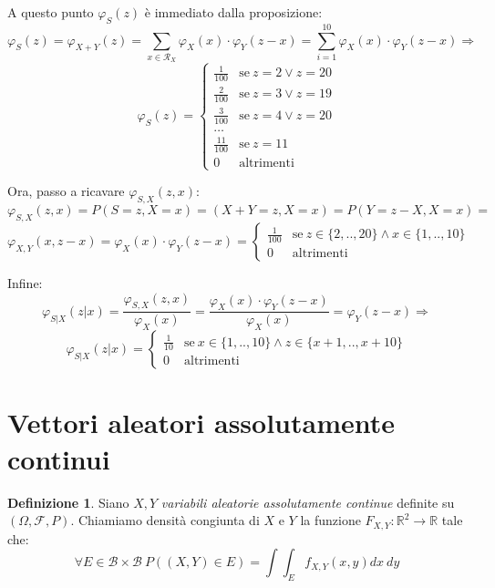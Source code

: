 \documentclass[12pt, a4paper]{report}
\theoremstyle{definition}
\newtheorem{definition}{Definizione}[section]
\DeclareRobustCommand{\F}{\mathcal{F}}%
\DeclareRobustCommand{\R}{\mathbb{R}}%
\DeclareRobustCommand{\B}{\mathcal{B}}%
\DeclareRobustCommand{\supp}{\mathcal{R}}%
\DeclareRobustCommand{\probspace}{(\Omega,\F,P)}
\begin{document}
A questo punto $\varphi_S(z)$ è immediato dalla proposizione:
\[\varphi_S(z)=\varphi_{X+Y}(z)=\sum_{x\in\supp_X}\varphi_X(x)\cdot \varphi_Y(z-x)=
\sum_{i=1}^{10}\varphi_X(x)\cdot \varphi_Y(z-x)\Rightarrow\]
\[\varphi_S(z)=\begin{cases}
	{\frac{1}{100}} & \text{se}\ {z=2\vee z=20}\\
	{\frac{2}{100}} & \text{se}\ {z=3\vee z=19}\\
	{\frac{3}{100}} & \text{se}\ {z=4\vee z=20}\\
	\dots\\
	{\frac{11}{100}} & \text{se}\ {z=11}\\
	{0} & \text{altrimenti}
\end{cases}\]

Ora, passo a ricavare $\varphi_{S,X}(z,x)$:
\[\varphi_{S,X}(z,x)=P(S=z,X=x)=(X+Y=z,X=x)=P(Y=z-X,X=x)=\]
\[\varphi_{X,Y}(x,z-x)=\varphi_X(x)\cdot \varphi_Y(z-x)=\begin{cases}
	{\frac{1}{100}} & \text{se}\ {z\in\{2,..,20\}\wedge x\in\{1,..,10\}}\\
	{0} & \text{altrimenti}
\end{cases}\]

Infine:
\[\varphi_{S|X}(z|x)=\frac{\varphi_{S,X}(z,x)}{\varphi_X(x)}=\frac{\varphi_X(x)\cdot 
\varphi_Y(z-x)}{\varphi_X(x)}=\varphi_Y(z-x)\Rightarrow\]
\[\varphi_{S|X}(z|x)=\begin{cases}
	{\frac{1}{10}} & \text{se}\ {x\in\{1,..,10\}\wedge z\in\{x+1,..,x+10\}}\\
	{0} & \text{altrimenti}
\end{cases}\]

\section{Vettori aleatori assolutamente continui}
\begin{definition}
	Siano $X,Y$ \emph{variabili aleatorie assolutamente continue} definite su
	$\probspace$. Chiamiamo densità congiunta di $X$ e $Y$ la funzione \(F_{X,Y}
	:\R^2\rightarrow\R\) tale che:
	\[\forall E\in\B\times\B\ P((X,Y)\in E)=\int\int_E f_{X,Y}(x,y)dx\ dy\]
\end{definition}
\end{document}
